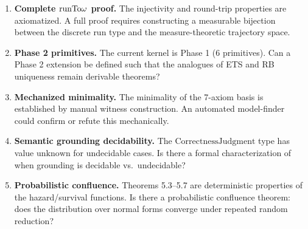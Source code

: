 \begin{enumerate}[label=\textbf{Q\arabic*}]
  \item \textbf{Complete $\mathrm{runTo}\omega$ proof.} The injectivity and round-trip
        properties are axiomatized. A full proof requires constructing a
        measurable bijection between the discrete run type and the
        measure-theoretic trajectory space.

  \item \textbf{Phase 2 primitives.} The current kernel is Phase 1 (6
        primitives). Can a Phase 2 extension be defined such that the analogues
        of ETS and RB uniqueness remain derivable theorems?

  \item \textbf{Mechanized minimality.} The minimality of the 7-axiom basis
        is established by manual witness construction. An automated model-finder
        could confirm or refute this mechanically.

  \item \textbf{Semantic grounding decidability.} The $\mathrm{CorrectnessJudgment}$
        type has value $\mathrm{unknown}$ for undecidable cases. Is there a
        formal characterization of when grounding is decidable vs.\ undecidable?

  \item \textbf{Probabilistic confluence.} Theorems 5.3--5.7 are deterministic
        properties of the hazard/survival functions. Is there a probabilistic
        confluence theorem: does the distribution over normal forms converge
        under repeated random reduction?
\end{enumerate}
